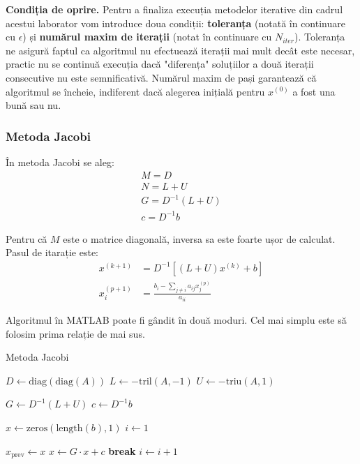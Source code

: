 \documentclass{exam}
\begin{document}
\textbf{Condiția de oprire.}  Pentru a finaliza execuția metodelor iterative din
cadrul acestui laborator vom introduce doua condiții: \textbf{toleranța} (notată
în continuare cu \(\epsilon\)) și \textbf{numărul maxim de iterații} (notat în
continuare cu \(N_{iter}\)). Toleranța ne asigură faptul ca algoritmul nu
efectuează iterații mai mult decât este necesar, practic nu se continuă execuția
dacă "diferența" soluțiilor a două iterații consecutive nu este semnificativă.
Numărul maxim de pași garantează că algoritmul se încheie, indiferent dacă
alegerea inițială pentru \(x^{(0)}\) a fost una bună sau nu.

\subsubsection{Metoda Jacobi}
În metoda Jacobi se aleg:
\begin{gather*}
	M = D \\
	N = L + U \\
	G = D^{-1}(L + U) \\
	c = D^{-1}b
\end{gather*}

Pentru că $M$ este o matrice diagonală, inversa sa este foarte ușor de calculat.
Pasul de itarație este:
\begin{align*}
	x^{(k + 1)} & = D^{-1}[(L + U)x^{(k)} + b]                            \\
	x_i^{(p+1)} & = \frac{b_i - \sum_{j \neq i} a_{ij} x_j^{(p)}}{a_{ii}}
\end{align*}

Algoritmul în MATLAB poate fi gândit în două moduri. Cel mai simplu este să
folosim prima relație de mai sus.

\begin{algorithm}
	\caption{Metoda Jacobi}
	\begin{algorithmic}[1]
		\State \( D \gets \text{diag}(\text{diag}(A)) \) 
		\State \( L \gets -\text{tril}(A, -1) \) 
		\State \( U \gets -\text{triu}(A, 1) \) 

		\State \( G \gets D^{-1} (L + U) \) 
		\State \( c \gets D^{-1} b \) 

		\State \( x \gets \text{zeros}(\text{length}(b),1) \) 
		\State \( i \gets 1 \)

		\State \( x_{\text{prev}} \gets x \)
		\State \( x \gets G \cdot x + c \)
		\State \textbf{break}
		\EndIf
		\State \( i \gets i + 1 \)
		\EndWhile
	\end{algorithmic}
\end{algorithm}
\end{document}
